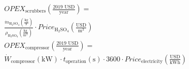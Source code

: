 \begin{refsection}[referencesCh6]
\begin{align}
& OPEX_{\text{scrubbers}} \left(\frac{\text{2019 USD}}{\text{year}}\right) = \label{eq:OPEXScrubber} \\
& \frac{\dot{m}_{\text{H}_2 \text{SO}_4} \left(\frac{\text{kg}}{\text{s}}\right)}{\rho_{\text{H}_2 \text{SO}_4} \left(\frac{\text{kg}}{\text{m}^3}\right)} \cdot Price_{\text{H}_2 \text{SO}_4} \left(\frac{\text{USD}}{\text{m}^3}\right)  \nonumber
\\
& OPEX_{\text{compressor}} \left(\frac{\text{2019 USD}}{\text{year}}\right) = \label{eq:compressorOPEX2} \\
& \dot{W}_{\text{compressor}} \left(\text{kW}\right) \cdot t_{\text{operation}} \left(\text{s}\right) \cdot  3600 \cdot Price_{\text{electricity}}\left(\frac{\text{USD}}{\text{kWh}}\right) \nonumber
\end{align}	

%




\end{refsection}
